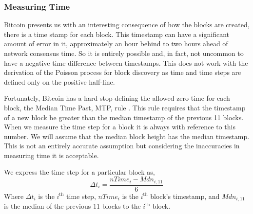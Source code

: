 \documentclass[runningheads]{llncs}
\begin{document}
\subsubsection{Measuring Time}
Bitcoin presents us with an interesting consequence of how the blocks are created, there is a time stamp for each block.
This timestamp can have a significant amount of error in it, approximately an hour behind to two hours ahead of network consensus time.
So it is entirely possible and, in fact, not uncommon to have a negative time difference between timestamps.
This does not work with the derivation of the Poisson process for block discovery as time and time steps are defined only on the positive half-line.

Fortunately, Bitcoin has a hard stop defining the allowed zero time for each block, the Median Time Past, MTP, rule \cite{bitcoin2021core}.
This rule requires that the timestamp of a new block be greater than the median timestamp of the previous 11 blocks.
When we measure the time step for a block it is always with reference to this number.
We will assume that the median block height has the median timestamp.
This is not an entirely accurate assumption but considering the inaccuracies in measuring time it is acceptable.
\begin{definition} \label{def:2}
    We express the time step for a particular block as,
    \begin{equation}
        \Delta t_i = \frac{nTime_i - Mdn_{i,11}}{6}
    \end{equation}
    Where $\Delta t_i$ is the $i^{\mbox{th}}$ time step, $nTime_i$ is the $i^{\mbox{th}}$ block's timestamp, and $Mdn_{i,11}$ is the median of the previous 11 blocks to the $i^{\mbox{th}}$ block.
\end{definition}
\end{document}
